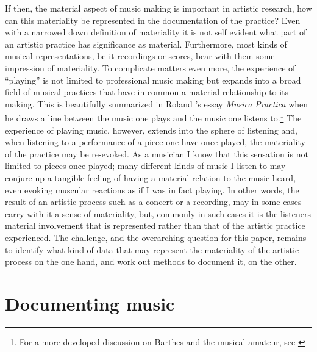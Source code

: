 \documentclass[11pt,a4paper]{article}
\begin{document}
If then, the material aspect of music making is important in artistic research, how can this materiality be represented in the documentation of the practice? Even with a narrowed down definition of materiality it is not self evident what part of an artistic practice has significance as material. Furthermore, most kinds of musical representations, be it recordings or scores, bear with them some impression of materiality.
To complicate matters even more, the experience of ``playing'' is not limited to professional music making but expands into a broad field of musical practices that have in common a material relationship to its making. This is beautifully summarized in Roland \textcite{barthesMus}'s essay \emph{Musica Practica} when he draws a line between the music one plays and the music one listens to.\footnote{For a more developed discussion on Barthes and the musical amateur, see \citep{frisk2016b}} The experience of playing music, however, extends into the sphere of listening and, when listening to a performance of a piece one have once played, the materiality of the practice may be re-evoked. As a musician I know that this sensation is not limited to pieces once played; many different kinds of music I listen to may conjure up a tangible feeling of having a material relation to the music heard, even evoking muscular reactions as if I was in fact playing. In other words, the result of an artistic process such as a concert or a recording, may in some cases carry with it a sense of materiality, but, commonly in such cases it is the listeners material involvement that is represented rather than that of the artistic practice experienced.
The challenge, and the overarching question for this paper, remains to identify what kind of data that may represent the materiality of the artistic process on the one hand, and work out methods to document it, on the other.

\section*{Documenting music}
\label{sec:docum-datab}
\end{document}
